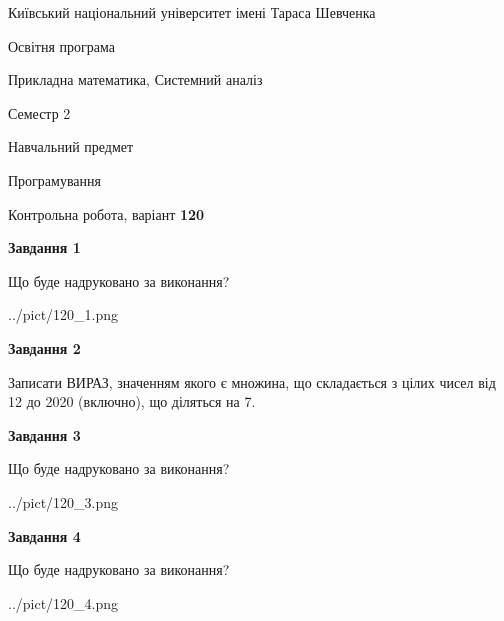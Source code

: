 \documentclass[12pt, ukrainian]{article}
\begin{document}
{{\begin {small}\par
{ \center  Київський національний університет імені Тараса Шевченка \par}
{\parbox {5 cm}{Освітня програма \hfill}{\parbox {8 cm}{Прикладна математика, Системний аналіз \hfill}}\parbox {5 cm}{\hfill Семестр 2}}\par
{\parbox {5 cm} {Навчальний предмет \hfill}\parbox {7 cm}{Програмування \hfill}\parbox {6cm}{\hfill}\par}\vspace{-7pt} \end{small}}{\center Контрольна робота, варіант  \No \textbf
{ 120 }\par}}
{
\begin {large}
{\begin {center}\textbf{Завдання 1}\end {center}}\par
Що буде надруковано за виконання?\par\par
\begin{center}
	{../pict/120_1.png}
\end{center}
\newpage

{\begin {center}\textbf{Завдання 2}\end {center}}\par
Записати ВИРАЗ, значенням якого є множина, що складається з цілих чисел від 12 до 2020 (включно), що діляться на 7.\par
\newpage

{\begin {center}\textbf{Завдання 3}\end {center}}\par
Що буде надруковано за виконання?\par
\begin{center}
	{../pict/120_3.png}
\end{center}
\newpage

{\begin {center}\textbf{Завдання 4}\end {center}}\par
Що буде надруковано за виконання?\par
\begin{center}
	{../pict/120_4.png}
\end{center}
\newpage


\end{large}}
\end{document}
